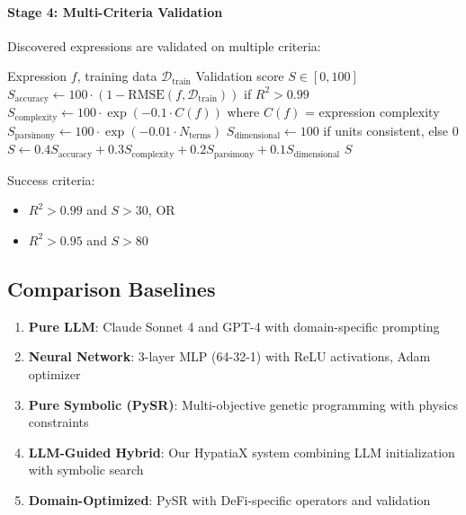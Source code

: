 \documentclass[twoside,11pt]{article}
\begin{document}
\paragraph{Stage 4: Multi-Criteria Validation}

Discovered expressions are validated on multiple criteria:

\begin{algorithm}[htbp]
\caption{Multi-Criteria Expression Validation}
\begin{algorithmic}[1]
\REQUIRE Expression $f$, training data $\mathcal{D}_{\text{train}}$
\ENSURE Validation score $S \in [0, 100]$
\STATE $S_{\text{accuracy}} \gets 100 \cdot (1 - \text{RMSE}(f, \mathcal{D}_{\text{train}}))$ if $R^2 > 0.99$
\STATE $S_{\text{complexity}} \gets 100 \cdot \exp(-0.1 \cdot C(f))$ where $C(f)$ = expression complexity
\STATE $S_{\text{parsimony}} \gets 100 \cdot \exp(-0.01 \cdot N_{\text{terms}})$
\STATE $S_{\text{dimensional}} \gets 100$ if units consistent, else $0$
\STATE $S \gets 0.4 S_{\text{accuracy}} + 0.3 S_{\text{complexity}} + 0.2 S_{\text{parsimony}} + 0.1 S_{\text{dimensional}}$
\RETURN $S$
\end{algorithmic}
\end{algorithm}

Success criteria:
\begin{itemize}
    \item $R^2 > 0.99$ and $S > 30$, OR
    \item $R^2 > 0.95$ and $S > 80$
\end{itemize}


\subsection{Comparison Baselines}

\begin{enumerate}
\item \textbf{Pure LLM}: Claude Sonnet 4 and GPT-4 with domain-specific prompting
\item \textbf{Neural Network}: 3-layer MLP (64-32-1) with ReLU activations, Adam optimizer
\item \textbf{Pure Symbolic (PySR)}: Multi-objective genetic programming with physics constraints
\item \textbf{LLM-Guided Hybrid}: Our HypatiaX system combining LLM initialization with symbolic search
\item \textbf{Domain-Optimized}: PySR with DeFi-specific operators and validation
\end{enumerate}
\end{document}
